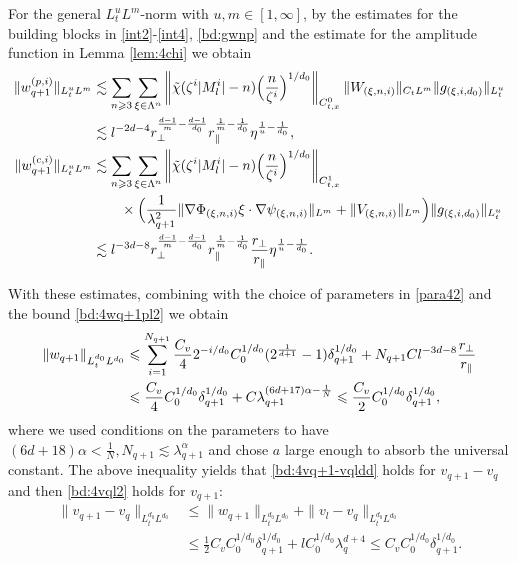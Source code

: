 \documentclass[UTF-8,reqno]{amsart}
\numberwithin{equation}{section}
\theoremstyle{definition}
\def\({{\Big(}}
\def\){{\Big)}}
\newcommand{\norm}[1]{\left\|#1\right\|}
\def\geq{\geqslant}
\def\leq{\leqslant}
\def\({{\Big(}}
\def\){{\Big)}}
\def\geq{\geqslant}
\def\leq{\leqslant}
\begin{document}
For the general $L^u_tL^m$-norm with $u,m\in[1,\infty]$, by the estimates for the building blocks in \eqref{int2}-\eqref{int4}, \eqref{bd:gwnp}
and the estimate for the amplitude function in  Lemma \ref{lem:4chi} we obtain
\begin{align}
\|w_{q+1}^{(p,i)}\|_{L^u_tL^m}&\lesssim\sum_{n\geq3}\sum_{\xi\in\Lambda^{n}}\norm{\tilde{\chi}(\zeta^{i}|M^{i}_l|-n)\(\frac{n}{\zeta^{i}}\)^{1/d_0}}_{C_{t,x}^0}\|W_{(\xi,n,i)}\|_{C_tL^m}\|g_{(\xi,i,d_0)}\|_{L_t^u}\notag\\
&\lesssim l^{-2d-4}r_\perp^{\frac{d-1}{m}-\frac{d-1}{d_0}} r_\parallel^{\frac{1}{m}-\frac{1}{d_0}}\eta^{\frac1u-\frac1{d_0}},\label{bd:4wq+1plp}\\
\|w_{q+1}^{(c,i)}\|_{L^u_tL^m}&\lesssim\sum_{n\geq3}\sum_{\xi\in\Lambda^{n}}\norm{\tilde{\chi}(\zeta^{i}|M^{i}_l|-n)\(\frac{n}{\zeta^{i}}\)^{1/d_0}}_{C^1_{t,x}}\notag\\ 
&\quad\quad \times\(\frac{1}{\lambda_{q+1}^2}\|\nabla\Phi_{(\xi,n,i)} \xi\cdot\nabla\psi_{(\xi,n,i)} \|_{L^m}+\|V_{(\xi,n,i)}\|_{L^m}\)\|g_{(\xi,i,d_0)}\|_{L_t^u}\notag\\
&\lesssim l^{-3d-8}r_\perp^{\frac{d-1}{m}-\frac{d-1}{d_0}} r_\parallel^{\frac{1}{m}-\frac{1}{d_0}}\frac{r_\perp}{ r_\parallel}\eta^{\frac1u-\frac1{d_0}}.\label{bd:4wq+1clp}
\end{align}

With these estimates, combining with the choice of parameters in  \eqref{para42} and the bound \eqref{bd:4wq+1pl2} we obtain 
\begin{align}
\|w_{q+1}\|_{L^{d_0}_tL^{d_0}}&\leq \sum_{i=1}^{N_{q+1}}\frac{C_v}42^{-i/d_0}C_0^{1/d_0}(2^{\frac1{d+1}}-1)\delta_{q+1}^{1/d_0}+N_{q+1}Cl^{-3d-8}\frac{r_\perp}{ r_\parallel}\notag \\
&\leq \frac{C_v}4C_0^{1/d_0}\delta_{q+1}^{1/d_0}+C\lambda_{q+1}^{(6d+17)\alpha-\frac1N} \leq \frac{C_v}2C_0^{1/d_0}\delta_{q+1}^{1/d_0},\label{bd:4wq+1l2}\end{align}
where we used  conditions on the parameters to have
${(6d+18)\alpha<\frac{1}{N}},N_{q+1}\lesssim\lambda_{q+1}^{\alpha}$ and chose $a$ large enough to absorb the universal constant. 
The above inequality   yields that \eqref{bd:4vq+1-vqldd} holds for $v_{q+1}-v_q$ and then \eqref{bd:4vql2} holds for $v_{q+1}$:
\begin{align*}
\|v_{q+1}-v_{q}\|_{L^{d_0}_tL^{d_0}}&\leq\|w_{q+1} \|_{L^{d_0}_tL^{d_0}}+\|v_{l}-v_{q}\|_{L^{d_0}_tL^{d_0}}\\
&\leq \frac12
C_vC_0^{1/d_0}\delta_{q+1}^{1/d_0}+lC_0^{1/d_0}\lambda_q^{d+4} \leq
C_vC_0^{1/d_0}\delta_{q+1}^{1/d_0}.
\end{align*}
\end{document}
